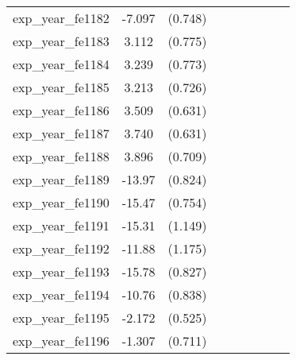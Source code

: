 {\begin{tabular}{l*{4}{cc}}
exp\_year\_fe1182&   -7.097\sym{***}&  (0.748)&                  &         &                  &         &                  &         \\
exp\_year\_fe1183&    3.112\sym{***}&  (0.775)&                  &         &                  &         &                  &         \\
exp\_year\_fe1184&    3.239\sym{***}&  (0.773)&                  &         &                  &         &                  &         \\
exp\_year\_fe1185&    3.213\sym{***}&  (0.726)&                  &         &                  &         &                  &         \\
exp\_year\_fe1186&    3.509\sym{***}&  (0.631)&                  &         &                  &         &                  &         \\
exp\_year\_fe1187&    3.740\sym{***}&  (0.631)&                  &         &                  &         &                  &         \\
exp\_year\_fe1188&    3.896\sym{***}&  (0.709)&                  &         &                  &         &                  &         \\
exp\_year\_fe1189&   -13.97\sym{***}&  (0.824)&                  &         &                  &         &                  &         \\
exp\_year\_fe1190&   -15.47\sym{***}&  (0.754)&                  &         &                  &         &                  &         \\
exp\_year\_fe1191&   -15.31\sym{***}&  (1.149)&                  &         &                  &         &                  &         \\
exp\_year\_fe1192&   -11.88\sym{***}&  (1.175)&                  &         &                  &         &                  &         \\
exp\_year\_fe1193&   -15.78\sym{***}&  (0.827)&                  &         &                  &         &                  &         \\
exp\_year\_fe1194&   -10.76\sym{***}&  (0.838)&                  &         &                  &         &                  &         \\
exp\_year\_fe1195&   -2.172\sym{***}&  (0.525)&                  &         &                  &         &                  &         \\
exp\_year\_fe1196&   -1.307         &  (0.711)&                  &         &                  &         &                  &         \\

\end{tabular}}
